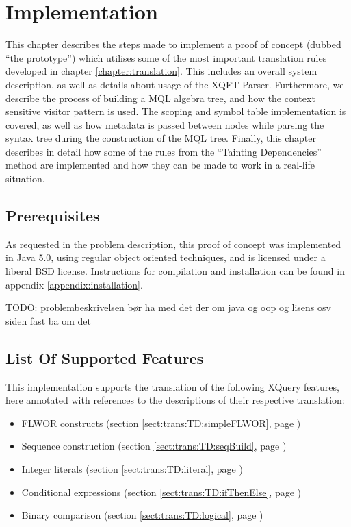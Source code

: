 \chapter{Implementation}
\label{chapter:implementation}
This chapter describes the steps made to implement a proof of concept (dubbed
``the prototype'') which utilises some of the most important translation
rules developed in chapter \ref{chapter:translation}. This includes an overall system
description, as well as details about usage of the XQFT Parser. Furthermore, we
describe the process of building a MQL algebra tree, and how the context
sensitive visitor pattern is used. The scoping and symbol table implementation
is covered, as well as how metadata is passed between nodes while parsing the
syntax tree during the construction of the MQL tree. Finally, this chapter describes in
detail how some of the rules from the ``Tainting Dependencies'' method are
implemented and how they can be made to work in a real-life situation.

\section{Prerequisites}
As requested in the problem description, this proof of concept was implemented
in Java 5.0, using regular object oriented techniques, and is licensed under a
liberal BSD license. Instructions for compilation and installation can be
found in appendix \ref{appendix:installation}.

TODO: problembeskrivelsen b\o r ha med det der om java og oop og lisens osv
siden fast ba om det

\section{List Of Supported Features}
This implementation supports the translation of the following XQuery features,
here annotated with references to the descriptions of their respective
translation:
\begin{itemize}
  \item FLWOR constructs (section \ref{sect:trans:TD:simpleFLWOR}, page
  \pageref{sect:trans:TD:simpleFLWOR})
  \item Sequence construction (section \ref{sect:trans:TD:seqBuild}, page
  \pageref{sect:trans:TD:seqBuild})
  \item Integer literals (section \ref{sect:trans:TD:literal}, page
  \pageref{sect:trans:TD:literal})
  \item Conditional expressions (section \ref{sect:trans:TD:ifThenElse}, page
  \pageref{sect:trans:TD:ifThenElse})
  \item Binary comparison (section \ref{sect:trans:TD:logical}, page
  \pageref{sect:trans:TD:logical})
\end{itemize}

